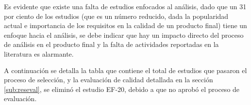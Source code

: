 \documentclass[conference,onecolumn,10pt]{IEEEtran}
\begin{document}
Es evidente que existe una falta de estudios enfocados al análisis, dado que un 31 por ciento de los estudios (que es un número reducido, 
dada la popularidad actual e importancia de los requisitos en la calidad de un producto final) tiene un enfoque hacia el análisis, se debe  
indicar que hay un impacto directo del proceso de análisis en el producto final y la falta de actividades reportadas en la literatura es 
alarmante. 
\newpage

A continuación se detalla la tabla que contiene el total de estudios que pasaron el proceso de selección, 
y la evaluación de calidad detallada en la sección \ref{sub:reseval}, se eliminó el estudio EF-20, debido a 
que no aprobó el proceso de evaluación. 

\begin{table}[!htbp]
\label{tab:total}
\caption{Tabla de estudios primarios encontrados } 
\centering
\end{table}
\end{document}
